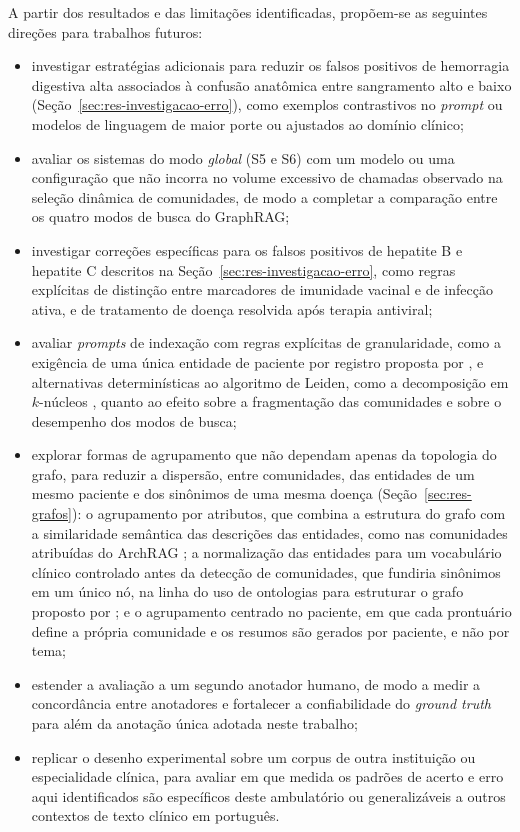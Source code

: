 A partir dos resultados e das limitações identificadas, propõem-se as seguintes direções para trabalhos futuros:

\begin{itemize}
    \item investigar estratégias adicionais para reduzir os falsos positivos de hemorragia digestiva alta associados à confusão anatômica entre sangramento alto e baixo (Seção~\ref{sec:res-investigacao-erro}), como exemplos contrastivos no \textit{prompt} ou modelos de linguagem de maior porte ou ajustados ao domínio clínico;
    \item avaliar os sistemas do modo \textit{global} (S5 e S6) com um modelo ou uma configuração que não incorra no volume excessivo de chamadas observado na seleção dinâmica de comunidades, de modo a completar a comparação entre os quatro modos de busca do GraphRAG;
    \item investigar correções específicas para os falsos positivos de hepatite B e hepatite C descritos na Seção~\ref{sec:res-investigacao-erro}, como regras explícitas de distinção entre marcadores de imunidade vacinal e de infecção ativa, e de tratamento de doença resolvida após terapia antiviral;
    \item avaliar \textit{prompts} de indexação com regras explícitas de granularidade, como a exigência de uma única entidade de paciente por registro proposta por \citet{ye2026}, e alternativas determinísticas ao algoritmo de Leiden, como a decomposição em $k$-núcleos \citep{hossain2026}, quanto ao efeito sobre a fragmentação das comunidades e sobre o desempenho dos modos de busca;
    \item explorar formas de agrupamento que não dependam apenas da topologia do grafo, para reduzir a dispersão, entre comunidades, das entidades de um mesmo paciente e dos sinônimos de uma mesma doença (Seção~\ref{sec:res-grafos}): o agrupamento por atributos, que combina a estrutura do grafo com a similaridade semântica das descrições das entidades, como nas comunidades atribuídas do ArchRAG \citep{wang2026archrag}; a normalização das entidades para um vocabulário clínico controlado antes da detecção de comunidades, que fundiria sinônimos em um único nó, na linha do uso de ontologias para estruturar o grafo proposto por \citet{wang2026}; e o agrupamento centrado no paciente, em que cada prontuário define a própria comunidade e os resumos são gerados por paciente, e não por tema;
    \item estender a avaliação a um segundo anotador humano, de modo a medir a concordância entre anotadores e fortalecer a confiabilidade do \textit{ground truth} para além da anotação única adotada neste trabalho;
    \item replicar o desenho experimental sobre um corpus de outra instituição ou especialidade clínica, para avaliar em que medida os padrões de acerto e erro aqui identificados são específicos deste ambulatório ou generalizáveis a outros contextos de texto clínico em português.
\end{itemize}
